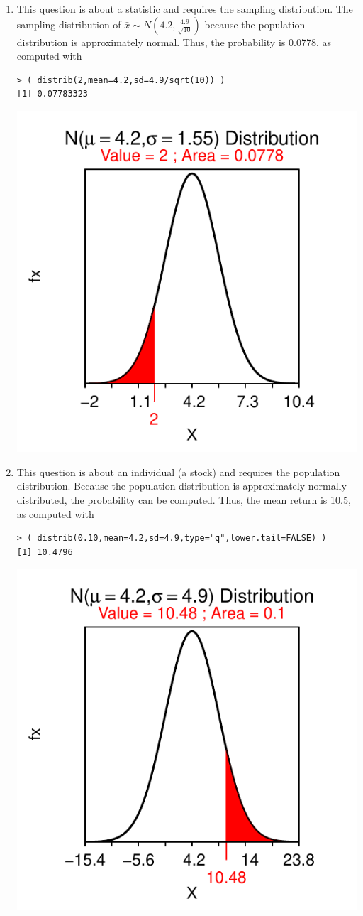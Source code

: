 \documentclass[10pt,openany]{book}\usepackage[]{graphicx}\usepackage[]{color}
\makeatletter
\newenvironment{kframe}{%
 \def\at@end@of@kframe{}%
 \ifinner\ifhmode%
  \def\at@end@of@kframe{\end{minipage}}%
  \begin{minipage}{\columnwidth}%
 \fi\fi%
 \def\FrameCommand##1{\hskip\@totalleftmargin \hskip-\fboxsep
 \colorbox{shadecolor}{##1}\hskip-\fboxsep
     \hskip-\linewidth \hskip-\@totalleftmargin \hskip\columnwidth}%
 \MakeFramed {\advance\hsize-\width
   \@totalleftmargin\z@ \linewidth\hsize
   \@setminipage}}%
 {\par\unskip\endMakeFramed%
 \at@end@of@kframe}
\newenvironment{knitrout}{}{} %
\makeatother
\begin{document}
\begin{itemize}
\begin{enumerate}
\begin{knitrout}
{}



\end{knitrout}
       \item This question is about a statistic and requires the sampling distribution.  The sampling distribution of $\bar{x}\sim N(4.2,\frac{4.9}{\sqrt{10}})$ because the population distribution is approximately normal.  Thus, the probability is 0.0778, as computed with
\begin{knitrout}
\color{fgcolor}\begin{kframe}
\begin{verbatim}
> ( distrib(2,mean=4.2,sd=4.9/sqrt(10)) )
[1] 0.07783323
\end{verbatim}
\end{kframe}

{\centering \includegraphics[width=.4\linewidth]{Figs/unnamed-chunk-315-1} 

}



\end{knitrout}
       \item This question is about an individual (a stock) and requires the population distribution. Because the population distribution is approximately normally distributed, the probability can be computed.  Thus, the mean return is 10.5, as computed with
\begin{knitrout}
\color{fgcolor}\begin{kframe}
\begin{verbatim}
> ( distrib(0.10,mean=4.2,sd=4.9,type="q",lower.tail=FALSE) )
[1] 10.4796
\end{verbatim}
\end{kframe}

{\centering \includegraphics[width=.4\linewidth]{Figs/unnamed-chunk-316-1} 

}
\end{knitrout}
\end{enumerate}
\end{itemize}
\end{document}

